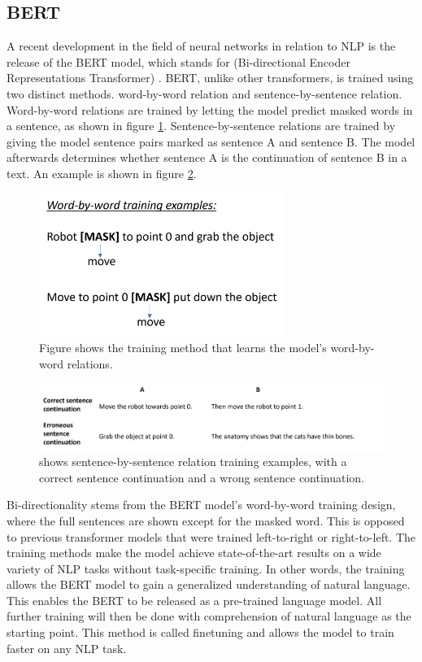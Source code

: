 \subsection{BERT} \label{sec:BERT}
A recent development in the field of neural networks in relation to NLP is the release of the BERT model, which stands for (Bi-directional Encoder Representations Transformer) \cite{47751}. 
BERT, unlike other transformers, is trained using two distinct methods. word-by-word relation and sentence-by-sentence relation. Word-by-word relations are trained by letting the model predict masked words in a sentence, as shown in figure \ref{fig:WBW_training}. Sentence-by-sentence relations are trained by giving the model sentence pairs marked as sentence A and sentence B. The model afterwards determines whether sentence A is the continuation of sentence B in a text. An example is shown in figure \ref{fig:SBS_training}.
 
 
\begin{figure}[ht]
    \centering
    \includegraphics[width=8cm]{img/word-by-word-training.png}
    \caption{Figure shows the training method that learns the model's word-by-word relations.}
    \label{fig:WBW_training}
\end{figure}

\begin{figure}[ht]
    \centering
    \includegraphics[width=12cm]{img/sentence-by-sentence-relation.png}
    \caption{shows sentence-by-sentence relation training examples, with a correct sentence continuation and a wrong sentence continuation.}
    \label{fig:SBS_training}
\end{figure}



Bi-directionality stems from the BERT model's word-by-word training design, where the full sentences are shown except for the masked word. This is opposed to previous transformer models that were trained left-to-right or right-to-left.
The training methods make the model achieve state-of-the-art results on a wide variety of NLP tasks without task-specific training. In other words, the training allows the BERT model to gain a generalized understanding of natural language. This enables the BERT to be released as a pre-trained language model. All further training will then be done with comprehension of natural language as the starting point. This method is called finetuning and allows the model to train faster on any NLP task. 

